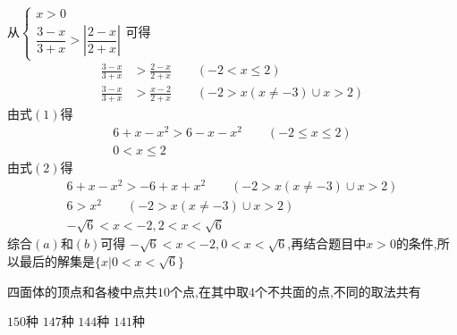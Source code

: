 \begin{questions}
	\begin{solution}
		从\begin{math}
			\begin{cases}
				x> 0 \\
				\dfrac{3-x}{3+x} > \left|\dfrac{2-x}{2+x}\right|
			\end{cases}
		\end{math}可得
		\begin{align*}
			\frac{3-x}{3+x} & > \frac{2-x}{2+x} \qquad (-2 < x \leqslant 2) \tag{1}          \\
			\frac{3-x}{3+x} & > \frac{x-2}{2+x}  \qquad (-2 > x(x\neq-3) \cup x > 2) \tag{2}
		\end{align*}
		由式$(1)$得
		\begin{align*}
			6+x-x^2> 6-x -x^2 \qquad (-2 \leqslant x \leqslant 2) \\
			0 < x \leqslant 2 \tag{a}
		\end{align*}
		由式$(2)$得
		\begin{align*}
			6 +x - x^2 > -6 +x + x^2 \qquad (-2 > x(x\neq-3) \cup x > 2) \\
			6 > x^2 \qquad (-2 > x (x\neq-3) \cup x > 2)                 \\
			-\sqrt{6} < x < -2, 2 < x < \sqrt{6} \tag{b}
		\end{align*}
		综合$(a)$和$(b)$可得 $-\sqrt{6}<x < -2, 0< x <
			\sqrt{6}$,再结合题目中$x>0$的条件,所以最后的解集是$\{x|0<x<\sqrt{6}\}$
	\end{solution}

	\question 四面体的顶点和各棱中点共$10$个点,在其中取$4$个不共面的点,不同的取法共有 \hfs

	\begin{oneparchoices}
		\choice $150$种
		\choice $147$种
		\choice $144$种
		\CorrectChoice $141$种
	\end{oneparchoices}


\end{questions}
